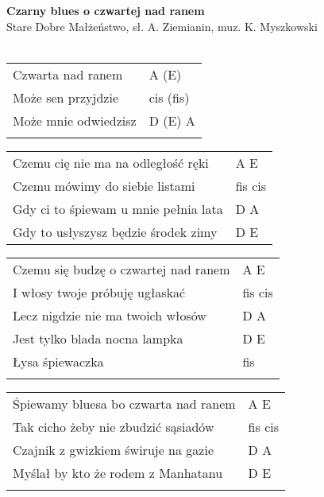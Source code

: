 \documentclass[a5paper]{article}
\begin{document}


\noindent
\fontsize{12pt}{15pt}\selectfont
\textbf{Czarny blues o czwartej nad ranem} \\
\fontsize{8pt}{10pt}\selectfont
Stare Dobre Małżeństwo, sł. A. Ziemianin, muz. K. Myszkowski \\ \\
\fontsize{10pt}{12pt}\selectfont

\begin{tabular}{@{}p{7cm}p{3cm}@{}}
\noindent
Czwarta nad ranem & A (E) \\
Może sen przyjdzie & cis (fis) \\
Może mnie odwiedzisz & D (E) A \\ \\
\end{tabular}

\noindent
\begin{tabular}{@{}p{8cm}p{3cm}@{}}
Czemu cię nie ma na odległość ręki & A E \\
Czemu mówimy do siebie listami & fis cis \\
Gdy ci to śpiewam u mnie pełnia lata & D A \\
Gdy to usłyszysz będzie środek zimy & D E \\
\end{tabular}

\noindent
\begin{tabular}{@{}p{8cm}p{3cm}@{}}
Czemu się budzę o czwartej nad ranem & A E \\
I włosy twoje próbuję ugłaskać & fis cis \\
Lecz nigdzie nie ma twoich włosów & D A \\
Jest tylko blada nocna lampka & D E \\
Łysa śpiewaczka & fis \\ \\
\end{tabular}

\noindent
\begin{tabular}{@{}p{8cm}p{3cm}@{}}
Śpiewamy bluesa bo czwarta nad ranem & A E \\
Tak cicho żeby nie zbudzić sąsiadów & fis cis \\
Czajnik z gwizkiem świruje na gazie & D A \\
Myślał by kto że rodem z Manhatanu & D E \\ \\
\end{tabular}
\end{document}
